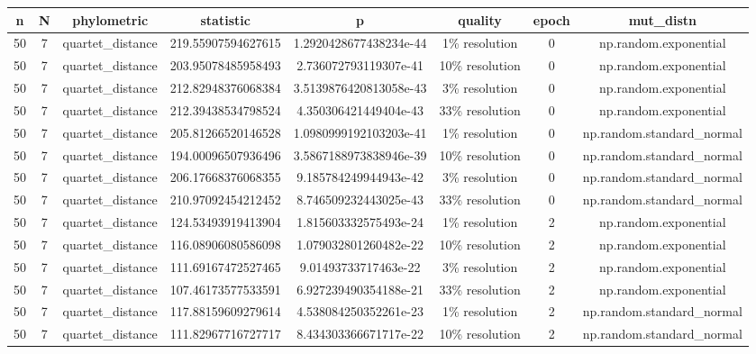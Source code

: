 \begin{longtable}{||c c c c c c c c||}\small
    \centering
     n & N & phylometric & statistic & p & quality & epoch & mut\_distn \\  [0.5ex]
     \hline
         50 & 7 & quartet\_distance & 219.55907594627615 & 1.2920428677438234e-44 & 1\% resolution & 0 & np.random.exponential \\
         50 & 7 & quartet\_distance & 203.95078485958493 & 2.736072793119307e-41 & 10\% resolution & 0 & np.random.exponential \\
         50 & 7 & quartet\_distance & 212.82948376068384 & 3.5139876420813058e-43 & 3\% resolution & 0 & np.random.exponential \\
         50 & 7 & quartet\_distance & 212.39438534798524 & 4.350306421449404e-43 & 33\% resolution & 0 & np.random.exponential \\
         50 & 7 & quartet\_distance & 205.81266520146528 & 1.0980999192103203e-41 & 1\% resolution & 0 & np.random.standard\_normal \\
         50 & 7 & quartet\_distance & 194.00096507936496 & 3.5867188973838946e-39 & 10\% resolution & 0 & np.random.standard\_normal \\
         50 & 7 & quartet\_distance & 206.17668376068355 & 9.185784249944943e-42 & 3\% resolution & 0 & np.random.standard\_normal \\
         50 & 7 & quartet\_distance & 210.97092454212452 & 8.746509232443025e-43 & 33\% resolution & 0 & np.random.standard\_normal \\
         50 & 7 & quartet\_distance & 124.53493919413904 & 1.815603332575493e-24 & 1\% resolution & 2 & np.random.exponential \\
         50 & 7 & quartet\_distance & 116.08906080586098 & 1.079032801260482e-22 & 10\% resolution & 2 & np.random.exponential \\
         50 & 7 & quartet\_distance & 111.69167472527465 & 9.01493733717463e-22 & 3\% resolution & 2 & np.random.exponential \\
         50 & 7 & quartet\_distance & 107.46173577533591 & 6.927239490354188e-21 & 33\% resolution & 2 & np.random.exponential \\
         50 & 7 & quartet\_distance & 117.88159609279614 & 4.538084250352261e-23 & 1\% resolution & 2 & np.random.standard\_normal \\
         50 & 7 & quartet\_distance & 111.82967716727717 & 8.434303366671717e-22 & 10\% resolution & 2 & np.random.standard\_normal \\

\end{longtable}
